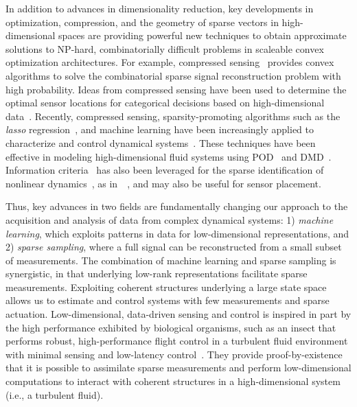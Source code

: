 \documentclass[letterpaper]{IEEEtran}
\begin{document}
In addition to advances in dimensionality reduction, key developments in optimization, compression, and the geometry of sparse vectors in high-dimensional spaces are providing powerful new techniques to obtain approximate solutions to NP-hard, combinatorially difficult problems in scaleable convex optimization architectures.  
For example, compressed sensing~\cite{Candes2006cpam,Donoho2006ieeetit,Baraniuk2007ieeespm} provides convex algorithms to solve the combinatorial sparse signal reconstruction problem with high probability.  
Ideas from compressed sensing have been used to determine the optimal sensor locations for categorical decisions based on high-dimensional data~\cite{Brunton2016siap}. %
Recently, compressed sensing, sparsity-promoting algorithms such as the \emph{lasso} regression~\cite{Tibshirani1996lasso,Hastie2009book,James2013book}, and machine learning have been increasingly applied to characterize and control dynamical systems~\cite{Schaeffer2013pnas,Ozolicnvs2013pnas,Brunton2014siads,Proctor2014epj,Brunton2016pnas,Mangan2016ieee,Loiseau2016arxiv,Rudy2017sciadv,Duriez2016book,Schaeffer2017prsa}.  
These techniques have been effective in modeling high-dimensional fluid systems using POD~\cite{Bai2014aiaa} and DMD~\cite{Brunton2015jcd,Tu2014ef,Jovanovic2014pof,Gueniat2015pof}.  
Information criteria~\cite{Akaike1973,Bayesian1978} has also been leveraged for the sparse identification of nonlinear dynamics~\cite{Brunton2016pnas}, as in~~\cite{Giannakis:2013,Mangan2017arxiv}, and may also be useful for sensor placement. 

Thus, key advances in two fields are fundamentally changing our approach to the acquisition and analysis of data from complex dynamical systems:  1) \emph{machine learning}, which exploits patterns in data for low-dimensional representations, and 2) \emph{sparse sampling}, where a full signal can be reconstructed from a small subset of measurements.  The combination of machine learning and sparse sampling is synergistic, in that underlying low-rank representations facilitate sparse measurements.  
Exploiting coherent structures underlying a large state space allows us to estimate and control systems with few measurements and sparse actuation.  Low-dimensional, data-driven sensing and control is inspired in part by the high performance exhibited by biological organisms, such as an insect that performs robust, high-performance flight control in a turbulent fluid environment with minimal sensing and low-latency control~\cite{Manohar2016jfs}.  They provide proof-by-existence that it is possible to assimilate sparse measurements and perform low-dimensional computations to interact with coherent structures in a high-dimensional system (i.e., a turbulent fluid).  
\end{document}
